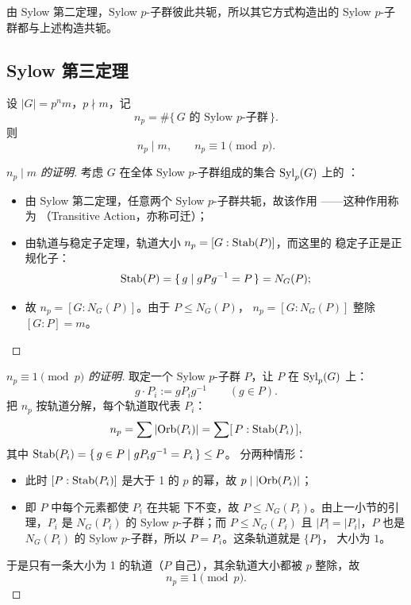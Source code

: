\begin{remark}
由 Sylow 第二定理，Sylow $p$-子群彼此共轭，所以其它方式构造出的
Sylow $p$-子群都与上述构造共轭。
\end{remark}

\subsection{Sylow 第三定理}

\begin{theorem}
设 $|G| = p^n m$，$p\nmid m$，记
\[
  n_p = \#\{\,\text{$G$ 的 Sylow $p$-子群}\,\}.
\]
则
\[
  n_p \mid m,\qquad n_p \equiv 1 \pmod p.
\]
\end{theorem}

\begin{proof}[$n_p\mid m$ 的证明]
考虑 $G$ 在全体 Sylow $p$-子群组成的集合 $\mathrm{Syl}_p(G)$ 上的
：
\begin{itemize}[leftmargin=1.3em,itemsep=2pt]
  \item 由 Sylow 第二定理，任意两个 Sylow $p$-子群共轭，故该作用
        ——这种作用称为
        （Transitive Action，亦称可迁）；
  \item 由轨道与稳定子定理，轨道大小 $n_p = [G : \mathrm{Stab}(P)]$，而这里的
        稳定子正是正规化子：
        \[
          \mathrm{Stab}(P) = \{\,g \mid gPg^{-1} = P\,\} = N_G(P);
        \]
  \item 故 $n_p = [G : N_G(P)]$。由于 $P\le N_G(P)$，
        $n_p = [G:N_G(P)]$ 整除 $[G:P] = m$。
\end{itemize}
\end{proof}

\begin{proof}[$n_p\equiv 1\pmod p$ 的证明]
取定一个 Sylow $p$-子群 $P$，让 $P$ 在 $\mathrm{Syl}_p(G)$
上：
\[
  g\cdot P_i := gP_i g^{-1}\qquad (g\in P).
\]
把 $n_p$ 按轨道分解，每个轨道取代表 $P_i$：
\[
  n_p = \sum |\mathrm{Orb}(P_i)| = \sum [\,P : \mathrm{Stab}(P_i)\,],
\]
其中 $\mathrm{Stab}(P_i) = \{\,g\in P \mid gP_ig^{-1} = P_i\,\} \le P$。
分两种情形：
\begin{itemize}[leftmargin=1.3em,itemsep=2pt]
  \item {}此时 $[P:\mathrm{Stab}(P_i)]$ 是大于 1
        的 $p$ 的幂，故 $p \mid |\mathrm{Orb}(P_i)|$；
  \item {}即 $P$ 中每个元素都使 $P_i$ 在共轭
        下不变，故 $P\le N_G(P_i)$。由上一小节的引理，$P_i$ 是
        $N_G(P_i)$ 的 Sylow $p$-子群；而
        $P\le N_G(P_i)$ 且 $|P| = |P_i|$，$P$ 也是 $N_G(P_i)$ 的
        Sylow $p$-子群，所以 $P = P_i$。这条轨道就是 $\{P\}$，
        大小为 $1$。
\end{itemize}
于是只有一条大小为 1 的轨道（$P$ 自己），其余轨道大小都被 $p$ 整除，故
\[
  n_p \equiv 1 \pmod p.
\]
\end{proof}
